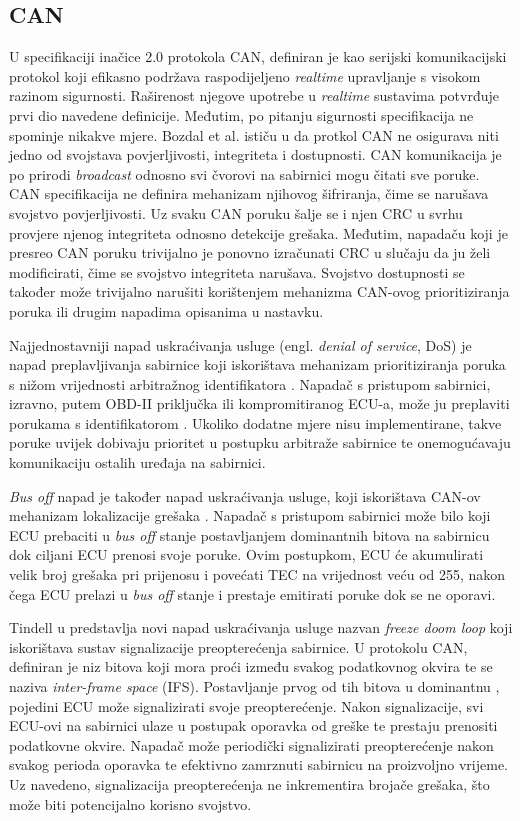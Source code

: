 \documentclass[times, utf8, diplomski, numeric]{fer}
\begin{document}
\subsection{CAN}
U specifikaciji inačice 2.0 protokola CAN, definiran je kao \glqq serijski komunikacijski protokol koji efikasno podržava raspodijeljeno \textit{realtime} upravljanje s visokom razinom sigurnosti\grqq \cite{bosch1991}. Raširenost njegove upotrebe u \textit{realtime} sustavima potvrđuje prvi dio navedene definicije. Međutim, po pitanju sigurnosti specifikacija ne spominje nikakve mjere. Bozdal et al. ističu u \cite{bozdal2020evaluation} da protkol CAN ne osigurava niti jedno od svojstava povjerljivosti, integriteta i dostupnosti. CAN komunikacija je po prirodi \textit{broadcast} odnosno svi čvorovi na sabirnici mogu čitati sve poruke. CAN specifikacija ne definira mehanizam njihovog šifriranja, čime se narušava svojstvo povjerljivosti. Uz svaku CAN poruku šalje se i njen CRC u svrhu provjere njenog integriteta odnosno detekcije grešaka. Međutim, napadaču koji je presreo CAN poruku trivijalno je ponovno izračunati CRC u slučaju da ju želi modificirati, čime se svojstvo integriteta narušava. Svojstvo dostupnosti se također može trivijalno narušiti korištenjem mehanizma CAN-ovog prioritiziranja poruka ili drugim napadima opisanima u nastavku.

Najjednostavniji napad uskraćivanja usluge (engl. \textit{denial of service}, DoS) je napad preplavljivanja sabirnice  koji iskorištava mehanizam prioritiziranja poruka s nižom vrijednosti arbitražnog identifikatora \cite{tindell2022can}. Napadač s pristupom sabirnici, izravno, putem OBD-II priključka ili kompromitiranog ECU-a, može ju preplaviti porukama s identifikatorom \grqq. Ukoliko dodatne mjere nisu implementirane, takve poruke uvijek dobivaju prioritet u postupku arbitraže sabirnice te onemogućavaju komunikaciju ostalih uređaja na sabirnici.

\textit{Bus off} napad je također napad uskraćivanja usluge, koji iskorištava CAN-ov mehanizam lokalizacije grešaka \cite{cho2016error}. Napadač s pristupom sabirnici može bilo koji ECU prebaciti u \textit{bus off} stanje postavljanjem dominantnih bitova na sabirnicu dok ciljani ECU prenosi svoje poruke. Ovim postupkom, ECU će akumulirati velik broj grešaka pri prijenosu i povećati TEC na vrijednost veću od 255, nakon čega ECU prelazi u \textit{bus off} stanje i prestaje emitirati poruke dok se ne oporavi.

Tindell u \cite{tindell2022can} predstavlja novi napad uskraćivanja usluge nazvan \textit{freeze doom loop} koji iskorištava sustav signalizacije preopterećenja sabirnice. U protokolu CAN, definiran je niz bitova koji mora proći između svakog podatkovnog okvira te se naziva \textit{inter-frame space} (IFS). Postavljanje prvog od tih bitova u dominantnu \grqq, pojedini ECU može signalizirati svoje preopterećenje. Nakon signalizacije, svi ECU-ovi na sabirnici ulaze u postupak oporavka od greške te prestaju prenositi podatkovne okvire. Napadač može periodički signalizirati preopterećenje nakon svakog perioda oporavka te efektivno zamrznuti sabirnicu na proizvoljno vrijeme. Uz navedeno, signalizacija preopterećenja ne inkrementira brojače grešaka, što može biti potencijalno korisno svojstvo.
\end{document}

